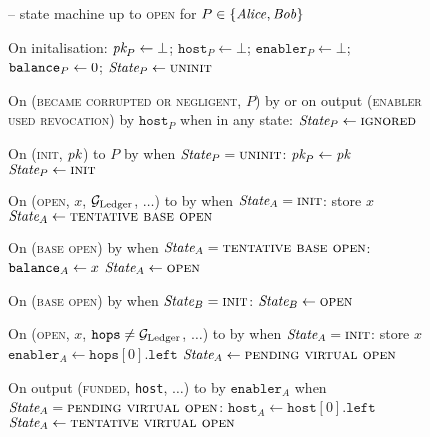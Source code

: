 \begin{figure}[H]
  \begin{systembox}{\fchan{} -- state machine up to \textsc{open} for $P \in
  \{\mathit{Alice}, \mathit{Bob}\}$}
    \begin{algorithmic}[1]
      \State On initalisation:
      \label{code:functionality:state-machine:boot}
      \Indent
        \State $\textit{pk}_{P} \gets \bot$; $\texttt{host}_P \gets \bot$;
        $\texttt{enabler}_P \gets \bot$; $\texttt{balance}_{P} \gets 0$;
        \State $\itistate_P \gets \textsc{uninit}$
      \EndIndent
      \Statex

      \State On (\textsc{became corrupted or negligent}, $P$) by \adversary or
      on output (\textsc{enabler used revocation}) by $\texttt{host}_P$ when in
      any state:
      \Indent
        \State $\itistate_P \gets \textsc{ignored}$
      \EndIndent
      \Statex

      \State On (\textsc{init}, $\textit{pk}_{}$) to $P$ by \environment when
      $\itistate_P = \textsc{uninit}$:
      \Indent
        \State $\textit{pk}_{P} \gets \textit{pk}_{}$
        \State $\itistate_P \gets \textsc{init}$
      \EndIndent
      \Statex

      \State On (\textsc{open}, $x$, $\mathcal{G}_{\mathrm{Ledger}}$, $\dots$) to \alice by
      \environment when $\itistate_A = \textsc{init}$:
      \Indent
        \State store $x$
        \State $\itistate_A \gets \textsc{tentative base open}$
      \EndIndent
      \Statex

      \State On (\textsc{base open}) by \adversary when $\itistate_A =
      \textsc{tentative base open}$:
      \Indent
        \State $\texttt{balance}_{A} \gets x$
        \State $\itistate_A \gets \textsc{open}$
      \EndIndent
      \Statex

      \State On (\textsc{base open}) by \adversary when $\itistate_B =
      \textsc{init}$:
      \label{code:functionality:state-machine:when-open-bob}
      \Indent
        \State $\itistate_B \gets \textsc{open}$
      \EndIndent
      \Statex

      \State On (\textsc{open}, $x$, $\texttt{hops} \neq \mathcal{G}_{\mathrm{Ledger}}$, $\dots$) to
      \alice by \environment when $\itistate_A = \textsc{init}$:
      \Indent
        \State store $x$
        \State $\texttt{enabler}_A \gets \texttt{hops}[0].\texttt{left}$
        \State $\itistate_A \gets \textsc{pending virtual open}$
      \EndIndent
      \Statex

      \State On output (\textsc{funded}, \texttt{host}, $\dots$) to \alice by
      $\texttt{enabler}_A$ when $\itistate_A = \textsc{pending virtual open}$:
      \Indent
        \State $\texttt{host}_A \gets \texttt{host}[0].\texttt{left}$
        \State $\itistate_A \gets \textsc{tentative virtual open}$
      \EndIndent
      \Statex


\end{algorithmic}
\end{systembox}
\end{figure}
